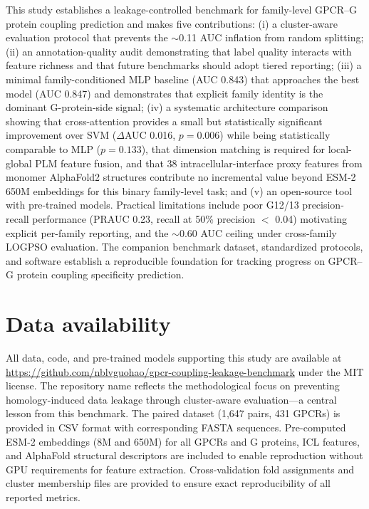 \documentclass[11pt,a4paper]{article}
\begin{document}
This study establishes a leakage-controlled benchmark for family-level GPCR--G protein coupling prediction and makes five contributions: (i) a cluster-aware evaluation protocol that prevents the $\sim$0.11 AUC inflation from random splitting; (ii) an annotation-quality audit demonstrating that label quality interacts with feature richness and that future benchmarks should adopt tiered reporting; (iii) a minimal family-conditioned MLP baseline (AUC 0.843) that approaches the best model (AUC 0.847) and demonstrates that explicit family identity is the dominant G-protein-side signal; (iv) a systematic architecture comparison showing that cross-attention provides a small but statistically significant improvement over SVM ($\Delta$AUC 0.016, $p = 0.006$) while being statistically comparable to MLP ($p = 0.133$), that dimension matching is required for local-global PLM feature fusion, and that 38 intracellular-interface proxy features from monomer AlphaFold2 structures contribute no incremental value beyond ESM-2 650M embeddings for this binary family-level task; and (v) an open-source tool with pre-trained models. Practical limitations include poor G12/13 precision-recall performance (PRAUC 0.23, recall at 50\% precision $<$ 0.04) motivating explicit per-family reporting, and the $\sim$0.60 AUC ceiling under cross-family LOGPSO evaluation. The companion benchmark dataset, standardized protocols, and software establish a reproducible foundation for tracking progress on GPCR--G protein coupling specificity prediction.

\section*{Data availability}

All data, code, and pre-trained models supporting this study are available at \url{https://github.com/nblvguohao/gpcr-coupling-leakage-benchmark} under the MIT license. The repository name reflects the methodological focus on preventing homology-induced data leakage through cluster-aware evaluation---a central lesson from this benchmark. The paired dataset (1,647 pairs, 431 GPCRs) is provided in CSV format with corresponding FASTA sequences. Pre-computed ESM-2 embeddings (8M and 650M) for all GPCRs and G proteins, ICL features, and AlphaFold structural descriptors are included to enable reproduction without GPU requirements for feature extraction. Cross-validation fold assignments and cluster membership files are provided to ensure exact reproducibility of all reported metrics.
\end{document}
